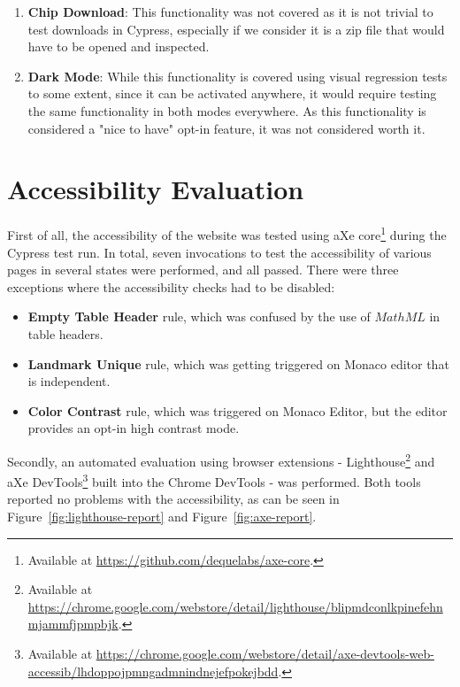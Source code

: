 \begin{enumerate}
    \item \textbf{Chip Download}: This functionality was not covered as it is not trivial to test downloads in Cypress, especially if we consider it is a zip file that would have to be opened and inspected.
    \item \textbf{Dark Mode}: While this functionality is covered using visual regression tests to some extent, since it can be activated anywhere, it would require testing the same functionality in both modes everywhere. As this functionality is considered a "nice to have" opt-in feature, it was not considered worth it.
\end{enumerate}

\section{Accessibility Evaluation}
\label{Evaluation-Accessibility}

First of all, the accessibility of the website was tested using aXe core\footnote{Available at \url{https://github.com/dequelabs/axe-core}.} during the Cypress test run.
In total, seven invocations to test the accessibility of various pages in several states were performed, and all passed.
There were three exceptions where the accessibility checks had to be disabled:

\begin{itemize}
    \item \textbf{Empty Table Header} rule, which was confused by the use of $MathML$ in table headers.
    \item \textbf{Landmark Unique} rule, which was getting triggered on Monaco editor that is independent.
    \item \textbf{Color Contrast} rule, which was triggered on Monaco Editor, but the editor provides an opt-in high contrast mode.
\end{itemize}

Secondly, an automated evaluation using browser extensions - Lighthouse\footnote{Available at \url{https://chrome.google.com/webstore/detail/lighthouse/blipmdconlkpinefehnmjammfjpmpbjk}.} and aXe DevTools\footnote{Available at \url{https://chrome.google.com/webstore/detail/axe-devtools-web-accessib/lhdoppojpmngadmnindnejefpokejbdd}.} built into the Chrome DevTools - was performed.
Both tools reported no problems with the accessibility, as can be seen in Figure~\ref{fig:lighthouse-report} and Figure~\ref{fig:axe-report}.

